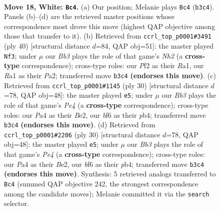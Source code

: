 \documentclass[11pt]{article}
\begin{document}
\clearpage

\begin{figure}[p]\centering
\begin{subfigure}{0.46\textwidth}\centering
\resizebox{\linewidth}{!}{%
\newchessgame
\chessboard[
  setfen={rnbqk2r/5p2/1p2pb2/p3N1p1/P2P4/1BN4P/1P3PP1/R2Q1RK1 w q - 0 18},
  showmover=false,
  pgfstyle=straightmove, color=movearrow, markmove={b3-c4}
]}
\caption{}
\end{subfigure}\hfill
\begin{subfigure}{0.46\textwidth}\centering
\resizebox{\linewidth}{!}{%
\newchessgame
\chessboard[
  setfen={r1bq3k/pp4bp/2p1r1p1/2P2p2/3Pn3/2N1B2P/PP4PN/R2QR1K1 w - - 0 21},
  showmover=false,
  pgfstyle=straightmove, color=movearrow, markmove={h2-f3}
]}
\caption{}
\end{subfigure}
\\[4pt]
\begin{subfigure}{0.46\textwidth}\centering
\resizebox{\linewidth}{!}{%
\newchessgame
\chessboard[
  setfen={r1bq1rk1/p4p2/2p1pb2/6p1/1ppPP3/2N5/PP2B1PP/R2Q1RK1 w - - 0 16},
  showmover=false,
  pgfstyle=straightmove, color=movearrow, markmove={e4-e5}
]}
\caption{}
\end{subfigure}\hfill
\begin{subfigure}{0.46\textwidth}\centering
\resizebox{\linewidth}{!}{%
\newchessgame
\chessboard[
  setfen={r1bq1rk1/p4p2/2p1pb2/6p1/1ppPP3/2N5/PP2B1PP/R2Q1RK1 w - - 0 16},
  showmover=false,
  pgfstyle=straightmove, color=movearrow, markmove={e4-e5}
]}
\caption{}
\end{subfigure}
\caption{\textbf{Move 18, White: \texttt{Bc4}.} (a) Our position; Melanie plays \texttt{Bc4} (\texttt{b3c4}). Panels (b)--(d) are the retrieved master positions whose correspondence most drove this move (highest QAP objective among those that transfer to it). (b) Retrieved from \texttt{ccrl\_top\_p0001\#3491} (ply 40) [structural distance $d$=84, QAP obj=51]: the master played \texttt{Nf3}; under $\mu$ our \emph{Bb3} plays the role of that game's \emph{Nh2} (a \textbf{cross-type} correspondence); cross-type roles: our \emph{P}f2 as their \emph{R}a1, our \emph{R}a1 as their \emph{P}a2; transferred move \texttt{b3c4} \textbf{(endorses this move)}. (c) Retrieved from \texttt{ccrl\_top\_p0001\#1145} (ply 30) [structural distance $d$=78, QAP obj=48]: the master played \texttt{e5}; under $\mu$ our \emph{Bb3} plays the role of that game's \emph{Pe4} (a \textbf{cross-type} correspondence); cross-type roles: our \emph{P}a4 as their \emph{B}e2, our \emph{b}f6 as their \emph{p}b4; transferred move \texttt{b3c4} \textbf{(endorses this move)}. (d) Retrieved from \texttt{ccrl\_top\_p0001\#2206} (ply 30) [structural distance $d$=78, QAP obj=48]: the master played \texttt{e5}; under $\mu$ our \emph{Bb3} plays the role of that game's \emph{Pe4} (a \textbf{cross-type} correspondence); cross-type roles: our \emph{P}a4 as their \emph{B}e2, our \emph{b}f6 as their \emph{p}b4; transferred move \texttt{b3c4} \textbf{(endorses this move)}. Synthesis: 5 retrieved analogs transferred to \texttt{Bc4} (summed QAP objective 242, the strongest correspondence among the candidate moves); Melanie committed it via the \texttt{search} selector.}
\label{fig:thought-m34}
\end{figure}
\end{document}

